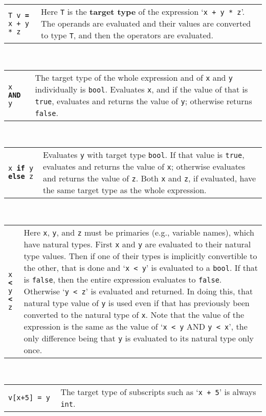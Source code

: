 \documentclass[12pt]{article}
\newcommand{\TT}[1]{{\tt \bfseries #1}}
\newcommand{\key}[1]{{\rm \bfseries #1}}
\begin{document}
\begin{tabular}{p{1.5in}p{4.5in}}
\tt T v \TT{=} x + y * z
     & Here {\tt T} is the \key{target type} of the expression
       `{\tt x + y * z}'.  The operands are evaluated and their values
       are converted to type {\tt T}, and then the operators are evaluated.
\end{tabular}
\\[0.5ex]
\begin{tabular}{p{1.5in}p{4.5in}}
\tt x \TT{AND} y & The target type of the whole expression and of {\tt x} and
                   {\tt y} individually is {\tt bool}.
		   Evaluates {\tt x}, and if the value of that is {\tt true},
                   evaluates and returns the value of {\tt y}; otherwise
		   returns {\tt false}.
\end{tabular}
\\[0.5ex]
\begin{tabular}{p{1.5in}p{4.5in}}
\tt x \TT{if} y \TT{else} z 
    & Evaluates {\tt y} with target type {\tt bool}.  If that value
      is {\tt true}, evaluates and returns the value of {\tt x}; otherwise
      evaluates and returns the value of {\tt z}.  Both {\tt x} and {\tt z},
      if evaluated, have the same target type as the whole expression.
\end{tabular}
\\[0.5ex]
\begin{tabular}{p{1.5in}p{4.5in}}
\tt x \TT{<} y \TT{<} z
    & Here {\tt x}, {\tt y}, and {\tt z} must be primaries (e.g., variable
      names), which have natural types.  First {\tt x} and {\tt y} are
      evaluated to their natural type values.  Then if one of their types
      is implicitly convertible to the other, that is done and `{\tt x < y}'
      is evaluated to a {\tt bool}.  If that is {\tt false}, then the
      entire expression evaluates to {\tt false}.  Otherwise `{\tt y < z}'
      is evaluated and returned.  In doing this, that natural type
      value of {\tt y} is used even if that has previously been converted
      to the natural type of {\tt x}.  Note that the value of the expression
      is the same as the value of `{\tt x < y} AND {\tt y < x}', the only
      difference being that {\tt y} is evaluated to its natural type only
      once.
\end{tabular}
\\[0.5ex]
\begin{tabular}{p{1.5in}p{4.5in}}
\tt v[x+5] = y
    & The target type of subscripts such as `{\tt x + 5}' is always {\tt int}.
\end{tabular}
\end{document}
